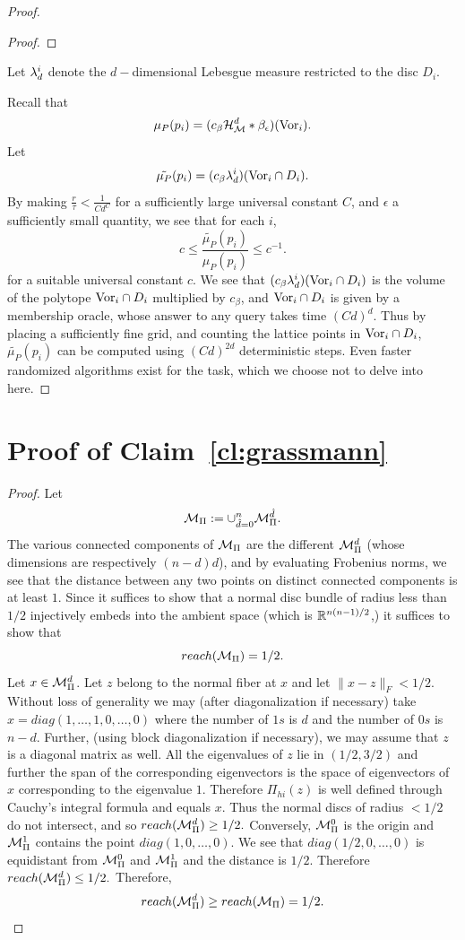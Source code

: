 \documentclass[final, 12pt]{colt2018} %
\begin{document}
\begin{proof}
\begin{proof}
\end{proof}
Let $\lambda_d^i$ denote the $d-$dimensional Lebesgue measure restricted to the disc $D_i$. 

Recall that $$\mu_P(p_i) = (c_\beta \mathcal{H}_{\mathcal M}^d* \beta_{\epsilon})(\hbox{Vor}_i).$$
Let $$\tilde{\mu_P}(p_i) = (c_\beta  \lambda_d^i)(\hbox{Vor}_i \cap D_i).$$
By making $\frac{r}{\tau} < \frac{1}{Cd^C}$ for a sufficiently large universal constant $C$, and $\epsilon$ a sufficiently small quantity, we see that for each $i$, $$c \leq \frac{\tilde{\mu_P}(p_i)}{{\mu_P}(p_i)} \leq c^{-1}.$$ for a suitable universal constant $c$. We see that $(c_\beta  \lambda_d^i)(\hbox{Vor}_i \cap D_i)$ is the volume of the polytope $\hbox{Vor}_i \cap D_i$ multiplied by $c_\beta$, and $\hbox{Vor}_i \cap D_i$ is given by a membership oracle, whose answer to any query takes time $(Cd)^d$. Thus by placing a sufficiently fine grid, and counting the lattice points in $\hbox{Vor}_i \cap D_i$, $\tilde{\mu_P}(p_i)$ can be computed using $(Cd)^{2d}$ deterministic steps. Even faster randomized algorithms exist for the task, which we choose not to delve into here.
\end{proof}

\section{Proof of Claim~\ref{cl:grassmann}}
\begin{proof}
Let $$\mathcal M_\Pi := \cup_{\hat d=0}^n \mathcal M_\Pi^{\hat d}.$$ The various connected components 
of $\mathcal M_\Pi$ are the different $\mathcal M_\Pi^d$ (whose dimensions are respectively $(n-d)d$), and by evaluating Frobenius norms, we see that the distance between any two points on distinct connected components is at least $1$. Since it suffices to show that a normal disc bundle of radius less than $1/2$ injectively embeds into the ambient space (which is $\mathbb R^{n(n-1)/2}$,)  it suffices to show that
$$reach(\mathcal M_\Pi) = 1/2.$$ Let $x \in \mathcal M_\Pi^d$. Let $z$ belong to the normal fiber at $x$ and let $\|x-z\|_F < 1/2$. Without loss of generality we may (after diagonalization if necessary) take $x = diag(1, \dots, 1, 0, \dots, 0)$ where the number of $1s$ is $d$ and the number of $0s$ is $n-d$. Further, (using block diagonalization if necessary), we may assume that $z$ is a diagonal matrix as well. All the eigenvalues of $z$ lie in $(1/2, 3/2)$ and further the span of the corresponding eigenvectors is the space of eigenvectors of $x$ corresponding to the eigenvalue $1$. Therefore $\Pi_{hi}(z)$ is well defined through Cauchy's integral formula and equals $x$. Thus the normal discs of radius $< 1/2$ do not intersect, and so $reach(\mathcal M_\Pi^d) \geq 1/2.$ Conversely, $\mathcal M_\Pi^0$ is the origin and $\mathcal M_\Pi^1$ contains the point $diag(1, 0, \dots, 0)$. We see that $diag(1/2, 0, \dots, 0)$ is equidistant from $\mathcal M_\Pi^0$ and $\mathcal M_\Pi^1$ and the distance is $1/2$. Therefore $reach(\mathcal M_\Pi^d) \leq 1/2.$ Therefore, 
$$reach(\mathcal M_\Pi^d) \geq reach(\mathcal M_\Pi) = 1/2.$$
\end{proof}
\end{document}
